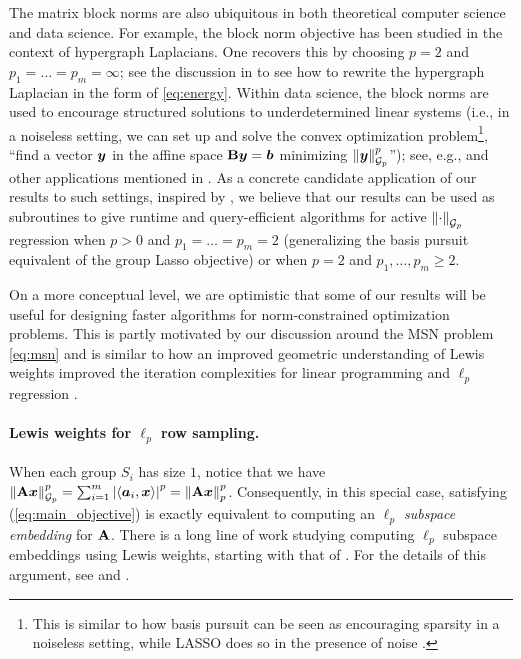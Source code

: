 \documentclass[11pt]{article}
\numberwithin{equation}{section}
\begin{document}
The matrix block norms are also ubiquitous in both theoretical computer science and data science. For example, the block norm objective has been studied in the context of hypergraph Laplacians. One recovers this by choosing $p=2$ and $p_1=\dots=p_m=\infty$; see the discussion in \cite[Section 1.2]{jls22} to see how to rewrite the hypergraph Laplacian in the form of \eqref{eq:energy}. Within data science, the block norms are used to encourage structured solutions to underdetermined linear systems (i.e., in a noiseless setting, we can set up and solve the convex optimization problem\footnote{This is similar to how basis pursuit can be seen as encouraging sparsity in a noiseless setting, while LASSO does so in the presence of noise \cite[Section 7.2]{Wainwright_2019}.}, ``find a vector $\bm{y}$ in the affine space $\mathbf{B}\bm{y} = \bm{b}$ minimizing $\left\lVert \bm{y} \right\rVert_{\mathcal{G}_{p}}^p$''); see, e.g., \cite{yy06,bach07,nie2010efficient,sfht13} and other applications mentioned in \cite{sra12}. As a concrete candidate application of our results to such settings, inspired by \cite{cd21,mmwy21}, we believe that our results can be used as subroutines to give runtime and query-efficient algorithms for active $\left\lVert \cdot \right\rVert_{\mathcal{G}_{p}}$ regression when $p > 0$ and $p_1=\dots=p_m=2$ (generalizing the basis pursuit equivalent of the group Lasso objective) or when $p=2$ and $p_1,\dots,p_m \ge 2$. 

On a more conceptual level, we are optimistic that some of our results will be useful for designing faster algorithms for norm-constrained optimization problems. This is partly motivated by our discussion around the MSN problem \eqref{eq:msn} and is similar to how an improved geometric understanding of Lewis weights improved the iteration complexities for linear programming and $\ell_p$ regression \cite{ls19,jls21}.

\paragraph{Lewis weights for $\ell_p$ row sampling.} When each group $S_i$ has size $1$, notice that we have $\left\lVert \mathbf{A}\bm{x} \right\rVert_{\mathcal{G}_{p}}^p = \sum_{i=1}^m \left\lvert \left\langle \bm{a}_i,\bm{x} \right\rangle \right\rvert^p = \left\lVert \mathbf{A}\bm{x} \right\rVert_p^p$. Consequently, in this special case, satisfying (\ref{eq:main_objective}) is exactly equivalent to computing an \textit{$\ell_p$ subspace embedding} for $\mathbf{A}$. There is a long line of work studying computing $\ell_p$ subspace embeddings using Lewis weights, starting with that of \citet{blm89}. For the details of this argument, see \cite[Section 7]{blm89} and \cite{sz01}. 
\end{document}
